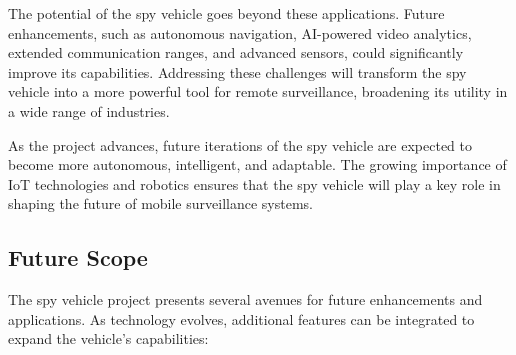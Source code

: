 \documentclass[12pt,a4paper]{report}
\begin{document}
The potential of the spy vehicle goes beyond these applications. Future enhancements, such as autonomous navigation, AI-powered video analytics, extended communication ranges, and advanced sensors, could significantly improve its capabilities. Addressing these challenges will transform the spy vehicle into a more powerful tool for remote surveillance, broadening its utility in a wide range of industries.

As the project advances, future iterations of the spy vehicle are expected to become more autonomous, intelligent, and adaptable. The growing importance of IoT technologies and robotics ensures that the spy vehicle will play a key role in shaping the future of mobile surveillance systems.


\label{Future Scope}
\subsection{Future Scope}
The spy vehicle project presents several avenues for future enhancements and applications. As technology evolves, additional features can be integrated to expand the vehicle's capabilities:
\end{document}
